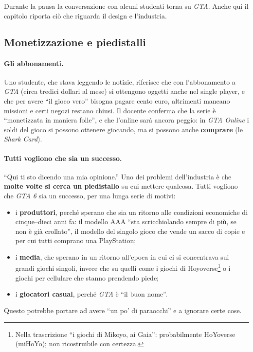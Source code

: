 Durante la pausa la conversazione con alcuni studenti torna su \emph{GTA}. Anche
qui il capitolo riporta ciò che riguarda il design e l'industria.

\subsection{Monetizzazione e piedistalli}

\paragraph{Gli abbonamenti.} Uno studente, che stava leggendo le notizie, riferisce
che con l'abbonamento a \emph{GTA} (circa tredici dollari al mese) si ottengono
oggetti anche nel single player, e che per avere ``il gioco vero'' bisogna pagare
cento euro, altrimenti mancano missioni e certi negozi restano chiusi. Il docente
conferma che la serie è ``monetizzata in maniera folle'', e che l'online sarà
ancora peggio: in \emph{GTA Online} i soldi del gioco si possono ottenere giocando,
ma si possono anche \textbf{comprare} (le \emph{Shark Card}).

\paragraph{Tutti vogliono che sia un successo.} ``Qui ti sto dicendo una mia
opinione.'' Uno dei problemi dell'industria è che \textbf{molte volte si cerca un
piedistallo} su cui mettere qualcosa. Tutti vogliono che \emph{GTA 6} sia un
successo, per una lunga serie di motivi:
\begin{itemize}
  \item i \textbf{produttori}, perché sperano che sia un ritorno alle condizioni
        economiche di cinque--dieci anni fa: il modello AAA ``sta scricchiolando
        sempre di più, se non è già crollato'', il modello del singolo gioco che
        vende un sacco di copie e per cui tutti comprano una PlayStation;
  \item i \textbf{media}, che sperano in un ritorno all'epoca in cui ci si
        concentrava sui grandi giochi singoli, invece che su quelli come i giochi
        di Hoyoverse\footnote{Nella trascrizione ``i giochi di Mikoyo, ai
        Gaia'': probabilmente HoYoverse (miHoYo); non ricostruibile con
        certezza.} o i giochi per cellulare che stanno prendendo piede;
  \item i \textbf{giocatori casual}, perché \emph{GTA} è ``il buon nome''.
\end{itemize}
Questo potrebbe portare ad avere ``un po' di paraocchi'' e a ignorare certe cose.

